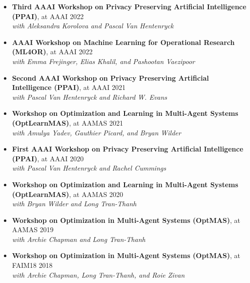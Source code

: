 \begin{itemize}
    \item 
    {\bf Third AAAI Workshop on Privacy Preserving Artificial Intelligence (PPAI)}, at AAAI   \hfill{2022}
    \\{\em with Aleksandra Korolova and Pascal Van Hentenryck}
    \item 
    {\bf AAAI Workshop on Machine Learning for Operational Research (ML4OR)}, at AAAI   \hfill{2022}
    \\{\em with Emma Frejinger, Elias Khalil, and Pashootan Vaezipoor}
    \item 
    {\bf Second AAAI Workshop on Privacy Preserving Artificial Intelligence (PPAI)}, at AAAI   \hfill{2021}
    \\{\em with Pascal Van Hentenryck and Richard W. Evans}
    \item 
    {\bf Workshop on Optimization and Learning in Multi-Agent Systems (OptLearnMAS)}, at AAMAS \hfill{2021}
    \\{\em with Amulya Yadev, Gauthier Picard, and Bryan Wilder}
    \item 
    {\bf First AAAI Workshop on Privacy Preserving Artificial Intelligence (PPAI)}, at AAAI   \hfill{2020}
    \\{\em with Pascal Van Hentenryck and Rachel Cummings}
    \item 
    {\bf Workshop on Optimization and Learning in Multi-Agent Systems (OptLearnMAS)}, at AAMAS \hfill{2020}
    \\{\em with Bryan Wilder and Long Tran-Thanh}
    \item 
    {\bf Workshop on Optimization in Multi-Agent Systems (OptMAS)}, at AAMAS \hfill{2019}
    \\{\em with Archie Chapman and Long Tran-Thanh}
    \item 
    {\bf Workshop on Optimization in Multi-Agent Systems (OptMAS)}, at FAIM18 \hfill{2018}
    \\{\em with Archie Chapman, Long Tran-Thanh, and Roie Zivan}
  \end{itemize}
  
